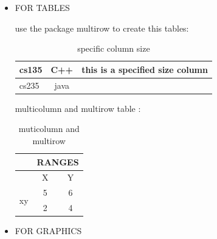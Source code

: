 \documentclass{article} %
\begin{document}
    \begin{itemize}
        \item FOR TABLES
        
        use the package multirow to create this tables:
        
        \begin{table}[htbp]
            \centering
            \begin{tabular}{| l | c | p{3cm} |}
            
            \hline
                cs135 & C++ & this is a specified size column\\
            \hline
                cs235 & java & \\
            \hline
            
            \end{tabular}
            \caption{specific column size}
            \label{tab:text wrapping}
        \end{table}
        
        multicolumn and multirow table :
        
        \begin{table}[htbp]
            \centering
            \begin{tabular}{| c | c | c |}
            
            \hline
                & \multicolumn{2}{c|}{RANGES} \\
            \hline
                & X & Y \\
            \hline
                \multirow{2}{*}{xy} & 5 & 6 \\
                & 2 & 4 \\
            \hline
            
            \end{tabular}
            \caption{muticolumn and multirow}
            \label{tab:muticolumn_and_multirow}
        \end{table}
        
        \item FOR GRAPHICS
        

\end{itemize}
\end{document}

